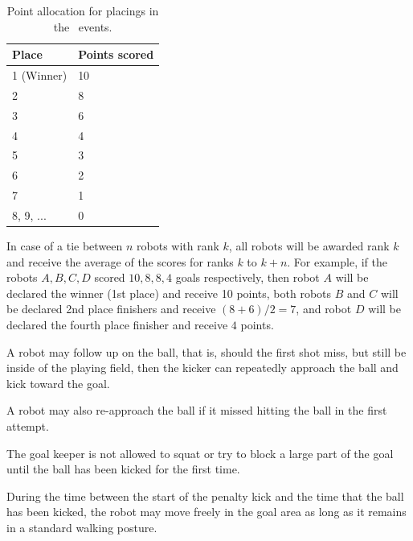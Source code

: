 \documentclass[12pt]{hurocup}
\begin{document}
\begin{lawlist}[PK]
\begin{itemize}
    \begin{table}
      \begin{center}
        \begin{tabular}{l|l}
          \hline
          Place & Points scored \\
          \hline
          1 (Winner) & 10 \\
          2          & 8 \\
          3          & 6 \\
          4          & 4 \\
          5          & 3 \\
          6          & 2 \\
          7          & 1 \\
          8, 9, ...  & 0 \\
          \hline
        \end{tabular}
      \end{center}
      \caption{Point allocation for placings in the \HuroCup\ events.}
      \label{point-allocation}
    \end{table}
 \end{itemize}

\item In case of a tie between $n$ robots with rank $k$, all robots
 will be awarded rank $k$ and receive the average of the scores for
 ranks $k$ to $k+n$.  For example, if the robots $A,B,C,D$ scored $10,
 8, 8, 4$ goals respectively, then robot $A$ will be declared the
 winner (1st place) and receive 10 points, both robots $B$ and $C$
 will be declared 2nd place finishers and receive $(8+6)/2=7$, and
 robot $D$ will be declared the fourth place finisher and receive $4$
 points.

\end{lawlist}

\begin{decisions}
\item A robot may follow up on the ball, that is, should the first
  shot miss, but still be inside of the playing field, then the kicker
  can repeatedly approach the ball and kick toward the goal.
\item A robot may also re-approach the ball if it missed hitting the
  ball in the first attempt.
\item The goal keeper is not allowed to squat or try to block a large
  part of the goal until the ball has been kicked for the first
  time. 
\item During the time between the start of the penalty kick and the
  time that the ball has been kicked, the robot may move freely in the
  goal area as long as it remains in a standard walking posture.
\end{decisions}
\end{document}
